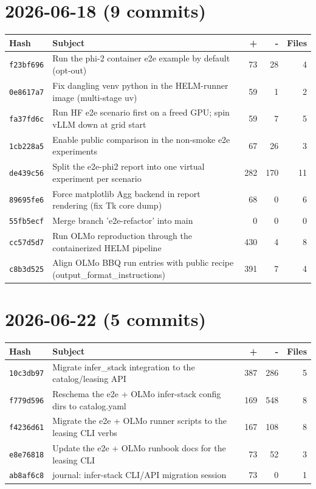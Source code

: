 \section*{2026-06-18 (9 commits)}
\begin{longtable}{@{}p{}p{}r r r@{}}
\toprule Hash & Subject & + & - & Files \\ \midrule\endhead
\texttt{f23bf696} & Run the phi-2 container e2e example by default (opt-out) & 73 & 28 & 4 \\
\texttt{0e8617a7} & Fix dangling venv python in the HELM-runner image (multi-stage uv) & 59 & 1 & 2 \\
\texttt{fa37fd6c} & Run HF e2e scenario first on a freed GPU; spin vLLM down at grid start & 59 & 7 & 5 \\
\texttt{1cb228a5} & Enable public comparison in the non-smoke e2e experiments & 67 & 26 & 3 \\
\texttt{de439c56} & Split the e2e-phi2 report into one virtual experiment per scenario & 282 & 170 & 11 \\
\texttt{89695fe6} & Force matplotlib Agg backend in report rendering (fix Tk core dump) & 68 & 0 & 6 \\
\texttt{55fb5ecf} & Merge branch 'e2e-refactor' into main & 0 & 0 & 0 \\
\texttt{cc57d5d7} & Run OLMo reproduction through the containerized HELM pipeline & 430 & 4 & 8 \\
\texttt{c8b3d525} & Align OLMo BBQ run entries with public recipe (output\_format\_instructions) & 391 & 7 & 4 \\
\bottomrule\end{longtable}
\section*{2026-06-22 (5 commits)}
\begin{longtable}{@{}p{}p{}r r r@{}}
\toprule Hash & Subject & + & - & Files \\ \midrule\endhead
\texttt{10c3db97} & Migrate infer\_stack integration to the catalog/leasing API & 387 & 286 & 5 \\
\texttt{f779d596} & Reschema the e2e + OLMo infer-stack config dirs to catalog.yaml & 169 & 548 & 8 \\
\texttt{f4236d61} & Migrate the e2e + OLMo runner scripts to the leasing CLI verbs & 167 & 108 & 8 \\
\texttt{e8e76818} & Update the e2e + OLMo runbook docs for the leasing CLI & 73 & 52 & 3 \\
\texttt{ab8af6c8} & journal: infer-stack CLI/API migration session & 73 & 0 & 1 \\
\bottomrule\end{longtable}
